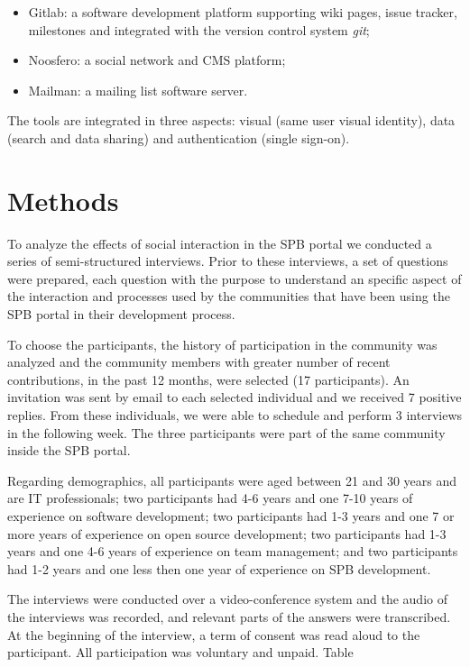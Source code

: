 \documentclass{sigchi}
\begin{document}
\begin{itemize}
  \item Gitlab: a software development platform supporting wiki pages, issue tracker, milestones and integrated with the version control system \textit{git};
  \item Noosfero: a social network and CMS platform;
  \item Mailman: a mailing list software server.
\end{itemize}

The tools are integrated in three aspects: visual (same user visual identity), data (search and data sharing) and authentication (single sign-on).

\section{Methods}

To analyze the effects of social interaction in the SPB portal we conducted a series of semi-structured interviews. Prior to these interviews, a set of questions were prepared, each question with the purpose to understand an specific aspect of the interaction and processes used by the communities that have been using the SPB portal in their development process. 

To choose the participants, the history of participation in the community was analyzed and the community members with greater number of recent contributions, in the past 12 months, were selected (17 participants). An invitation was sent by email to each selected individual and we received 7 positive replies. From these individuals, we were able to schedule and perform 3 interviews in the following week. The three participants were part of the same community inside the SPB portal.

Regarding demographics, all participants were aged between 21 and 30 years and are IT professionals; two participants had 4-6 years and one 7-10 years of experience on software development; two participants had 1-3 years and one 7 or more years of experience on open source development; two participants had 1-3 years and one 4-6 years of experience on team management; and two participants had 1-2 years and one less then one year of experience on SPB development.

The interviews were conducted over a video-conference system and the audio of the interviews was recorded, and relevant parts of the answers were transcribed. At the beginning of the interview, a term of consent \cite{usability.gov_2015} was read aloud to the participant. All participation was voluntary and unpaid. Table 
\end{document}
